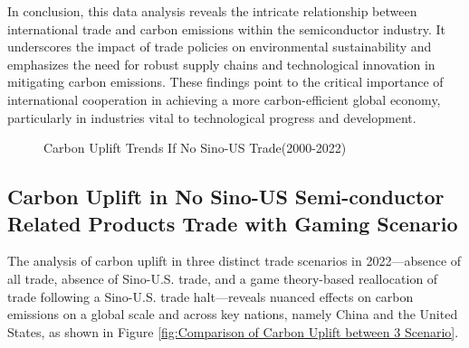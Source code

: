 In conclusion, this data analysis reveals the intricate relationship between international trade and carbon emissions within the semiconductor industry. It underscores the impact of trade policies on environmental sustainability and emphasizes the need for robust supply chains and technological innovation in mitigating carbon emissions. These findings point to the critical importance of international cooperation in achieving a more carbon-efficient global economy, particularly in industries vital to technological progress and development.
\ifincludefigures
\begin{figure}
 \centering
 \caption{Carbon Uplift Trends If No Sino-US Trade(2000-2022)}\label{fig:Carbon Uplift Trends If No Sino-US Trade(2000-2022)}
\end{figure}
\fi
\subsection{Carbon Uplift in No Sino-US Semi-conductor Related Products Trade with Gaming Scenario}

The analysis of carbon uplift in three distinct trade scenarios in 2022—absence of all trade, absence of Sino-U.S. trade, and a game theory-based reallocation of trade following a Sino-U.S. trade halt—reveals nuanced effects on carbon emissions on a global scale and across key nations, namely China and the United States, as shown in Figure \ref{fig:Comparison of Carbon Uplift between 3 Scenario}.

